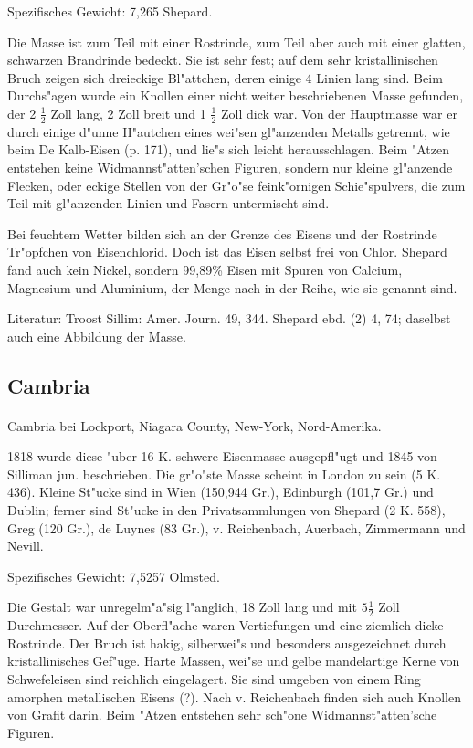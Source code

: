 \documentclass[a4paper, 11pt, oneside]{article}
\begin{document}
Spezifisches Gewicht: 7,265 Shepard.

Die Masse ist zum Teil mit einer Rostrinde, zum Teil aber auch mit einer glatten, schwarzen Brandrinde bedeckt. Sie ist sehr fest; auf dem sehr kristallinischen Bruch zeigen sich dreieckige Bl"attchen, deren einige 4 Linien lang sind. Beim Durchs"agen wurde ein Knollen einer nicht weiter beschriebenen Masse gefunden, der 2 $\frac{1}{2}$ Zoll lang, 2 Zoll breit und 1 $\frac{1}{2}$ Zoll dick war. Von der Hauptmasse war er durch einige d"unne H"autchen eines wei"sen gl"anzenden Metalls getrennt, wie beim De Kalb-Eisen (p. 171), und lie"s sich leicht herausschlagen. Beim "Atzen entstehen keine Widmannst"atten'schen Figuren, sondern nur kleine gl"anzende Flecken, oder eckige Stellen von der Gr"o"se feink"ornigen Schie"spulvers, die zum Teil mit gl"anzenden Linien und Fasern untermischt sind.

Bei feuchtem Wetter bilden sich an der Grenze des Eisens und der Rostrinde Tr"opfchen von Eisenchlorid. Doch ist das Eisen selbst frei von Chlor. Shepard fand auch kein Nickel, sondern 99,89\% Eisen mit Spuren von Calcium, Magnesium und Aluminium, der Menge nach in der Reihe, wie sie genannt sind.

\footnotesize
Literatur: Troost Sillim: Amer. Journ. 49, 344. Shepard ebd. (2) 4, 74; daselbst auch eine Abbildung der Masse.

\subsection{Cambria}
\normalsize
\paragraph{}
Cambria bei Lockport, Niagara County, New-York, Nord-Amerika.

1818 wurde diese "uber 16 K. schwere Eisenmasse ausgepfl"ugt und 1845 von Silliman jun. beschrieben. Die gr"o"ste Masse scheint in London zu sein (5 K. 436). Kleine St"ucke sind in Wien (150,944 Gr.), Edinburgh (101,7 Gr.) und Dublin; ferner sind St"ucke in den Privatsammlungen von Shepard (2 K. 558), Greg (120 Gr.), de Luynes (83 Gr.), v. Reichenbach, Auerbach, Zimmermann und Nevill.

Spezifisches Gewicht: 7,5257 Olmsted.

Die Gestalt war unregelm"a"sig l"anglich, 18 Zoll lang und mit $5\frac{1}{2}$ Zoll Durchmesser. Auf der Oberfl"ache waren Vertiefungen und eine ziemlich dicke Rostrinde. Der Bruch ist hakig, silberwei"s und besonders ausgezeichnet durch kristallinisches Gef"uge. Harte Massen, wei"se und gelbe mandelartige Kerne von Schwefeleisen sind reichlich eingelagert. Sie sind umgeben von einem Ring amorphen metallischen Eisens (?). Nach v. Reichenbach finden sich auch Knollen von Grafit darin. Beim "Atzen entstehen sehr sch"one Widmannst"atten'sche Figuren.
\end{document}
